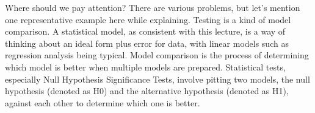 \documentclass{ltjsbook}
\begin{document}
\label{ModelComparison1}
Where should we pay attention? There are various problems, but let's mention one representative example here while explaining. Testing is a kind of model comparison. A statistical model, as consistent with this lecture, is a way of thinking about an ideal form plus error for data, with linear models such as regression analysis being typical. Model comparison is the process of determining which model is better when multiple models are prepared. Statistical tests, especially Null Hypothesis Significance Tests, involve pitting two models, the null hypothesis (denoted as H0) and the alternative hypothesis (denoted as H1), against each other to determine which one is better.
\end{document}
